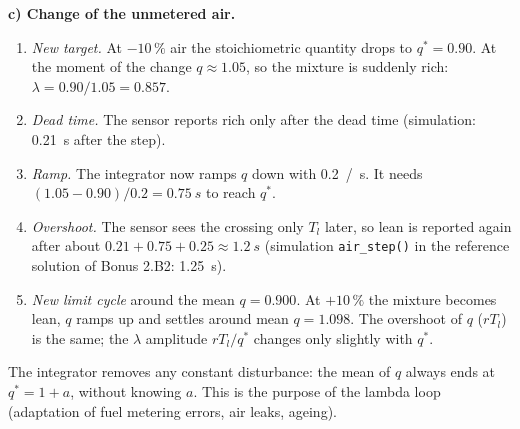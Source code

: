 \begin{solution}
\textbf{c) Change of the unmetered air.}
\begin{enumerate}[label=Step \arabic*:,leftmargin=*,itemsep=1pt]
  \item \emph{New target.} At $-10\,\%$ air the stoichiometric quantity drops
    to $q^*=0.90$. At the moment of the change $q\approx1.05$, so the mixture
    is suddenly rich: $\lambda=0.90/1.05=0.857$.
  \item \emph{Dead time.} The sensor reports rich only after the dead time
    (simulation: \SI{0.21}{s} after the step).
  \item \emph{Ramp.} The integrator now ramps $q$ down with \SI{0.2}{/s}. It
    needs $(1.05-0.90)/0.2=\SI{0.75}{s}$ to reach $q^*$.
  \item \emph{Overshoot.} The sensor sees the crossing only $T_l$ later, so lean
    is reported again after about $0.21+0.75+0.25\approx\SI{1.2}{s}$
    (simulation \texttt{air\_step()} in the reference solution of Bonus 2.B2:
    \SI{1.25}{s}).
  \item \emph{New limit cycle} around the mean $q=0.900$. At $+10\,\%$ the
    mixture becomes lean, $q$ ramps up and settles around mean $q=1.098$.
    The overshoot of $q$ ($rT_l$) is the same; the $\lambda$ amplitude
    $rT_l/q^*$ changes only slightly with $q^*$.
\end{enumerate}
The integrator removes any constant disturbance: the mean of $q$ always ends
at $q^*=1+a$, without knowing $a$. This is the purpose of the lambda loop
(adaptation of fuel metering errors, air leaks, ageing).


\end{solution}
